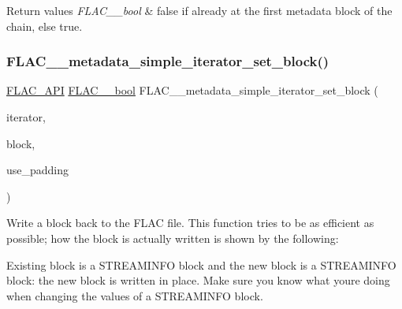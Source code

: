 \begin{DoxyRetVals}{Return values}
{\em F\+L\+A\+C\+\_\+\+\_\+bool} & {\ttfamily false} if already at the first metadata block of the chain, else {\ttfamily true}. \\
\hline
\end{DoxyRetVals}
\mbox{\label{group__flac__metadata__level1_ga7d1ceb2db292c968ae6ac18ecb15c356}} 
\subsubsection{\texorpdfstring{FLAC\_\_metadata\_simple\_iterator\_set\_block()}{FLAC\_\_metadata\_simple\_iterator\_set\_block()}}
{\footnotesize\ttfamily \mbox{\hyperlink{group__flac__export_ga56ca07df8a23310707732b1c0007d6f5}{F\+L\+A\+C\+\_\+\+A\+PI}} \mbox{\hyperlink{ordinals_8h_a95103469f1cbd78b8cf250194985b34e}{F\+L\+A\+C\+\_\+\+\_\+bool}} F\+L\+A\+C\+\_\+\+\_\+metadata\+\_\+simple\+\_\+iterator\+\_\+set\+\_\+block (\begin{DoxyParamCaption}\item[{\mbox{\hyperlink{group__flac__metadata__level1_ga6accccddbb867dfc2eece9ee3ffecb3a}{F\+L\+A\+C\+\_\+\+\_\+\+Metadata\+\_\+\+Simple\+Iterator}} $\ast$}]{iterator,  }\item[{\mbox{\hyperlink{struct_f_l_a_c_____stream_metadata}{F\+L\+A\+C\+\_\+\+\_\+\+Stream\+Metadata}} $\ast$}]{block,  }\item[{\mbox{\hyperlink{ordinals_8h_a95103469f1cbd78b8cf250194985b34e}{F\+L\+A\+C\+\_\+\+\_\+bool}}}]{use\+\_\+padding }\end{DoxyParamCaption})}

Write a block back to the F\+L\+AC file. This function tries to be as efficient as possible; how the block is actually written is shown by the following\+:

Existing block is a S\+T\+R\+E\+A\+M\+I\+N\+FO block and the new block is a S\+T\+R\+E\+A\+M\+I\+N\+FO block\+: the new block is written in place. Make sure you know what you\textquotesingle{}re doing when changing the values of a S\+T\+R\+E\+A\+M\+I\+N\+FO block.

